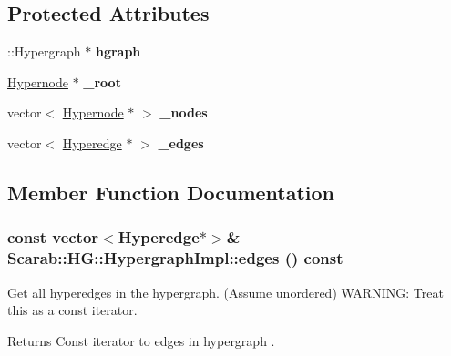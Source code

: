 \subsection*{Protected Attributes}
\begin{DoxyCompactItemize}
\item 
\hypertarget{classScarab_1_1HG_1_1HypergraphImpl_aa7192cf8f168e5bfed67a8faf85c8cb4}{
::Hypergraph $\ast$ {\bfseries hgraph}}
\label{classScarab_1_1HG_1_1HypergraphImpl_aa7192cf8f168e5bfed67a8faf85c8cb4}

\item 
\hypertarget{classScarab_1_1HG_1_1HypergraphImpl_a7035fdae4c04d0752aaaf1e7eba7600e}{
\hyperlink{classScarab_1_1HG_1_1Hypernode}{Hypernode} $\ast$ {\bfseries \_\-root}}
\label{classScarab_1_1HG_1_1HypergraphImpl_a7035fdae4c04d0752aaaf1e7eba7600e}

\item 
\hypertarget{classScarab_1_1HG_1_1HypergraphImpl_a4cc57d9255e2f09714c5913d67cd0554}{
vector$<$ \hyperlink{classScarab_1_1HG_1_1Hypernode}{Hypernode} $\ast$ $>$ {\bfseries \_\-nodes}}
\label{classScarab_1_1HG_1_1HypergraphImpl_a4cc57d9255e2f09714c5913d67cd0554}

\item 
\hypertarget{classScarab_1_1HG_1_1HypergraphImpl_a56fb710140f3359646b1a17cb0417d74}{
vector$<$ \hyperlink{classScarab_1_1HG_1_1Hyperedge}{Hyperedge} $\ast$ $>$ {\bfseries \_\-edges}}
\label{classScarab_1_1HG_1_1HypergraphImpl_a56fb710140f3359646b1a17cb0417d74}

\end{DoxyCompactItemize}


\subsection{Member Function Documentation}
\hypertarget{classScarab_1_1HG_1_1HypergraphImpl_a0c8373e545fe59b0cb7036b4751508e1}{
\subsubsection[{edges}]{\setlength{\rightskip}{0pt plus 5cm}const vector$<${\bf Hyperedge}$\ast$$>$\& Scarab::HG::HypergraphImpl::edges () const}}
\label{classScarab_1_1HG_1_1HypergraphImpl_a0c8373e545fe59b0cb7036b4751508e1}
Get all hyperedges in the hypergraph. (Assume unordered) WARNING: Treat this as a const iterator. \begin{DoxyReturn}{Returns}
Const iterator to edges in hypergraph . 
\end{DoxyReturn}


